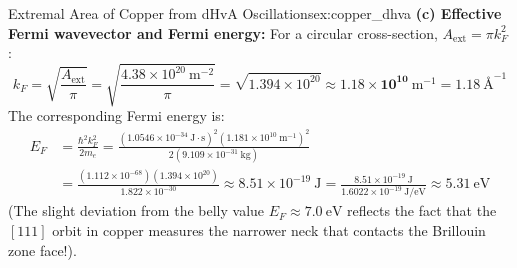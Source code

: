 \documentclass[11pt,a4paper]{article}
\begin{document}
\begin{examplebox}{Extremal Area of Copper from dHvA Oscillations}{ex:copper_dhva}
\textbf{(c) Effective Fermi wavevector and Fermi energy:}
For a circular cross-section, $A_{\mathrm{ext}} = \pi k_F^2$:
\[
k_F = \sqrt{\frac{A_{\mathrm{ext}}}{\pi}} = \sqrt{\frac{4.38 \times 10^{20}\ \mathrm{m^{-2}}}{\pi}} = \sqrt{1.394 \times 10^{20}} \approx \mathbf{1.18 \times 10^{10}\ \mathrm{m^{-1}}} = 1.18\ \text{\AA}^{-1}
\]
The corresponding Fermi energy is:
\begin{align*}
E_F &= \frac{\hbar^2 k_F^2}{2m_e} = \frac{(1.0546 \times 10^{-34}\ \mathrm{J\cdot s})^2 (1.181 \times 10^{10}\ \mathrm{m^{-1}})^2}{2(9.109 \times 10^{-31}\ \mathrm{kg})} \\
&= \frac{(1.112 \times 10^{-68})(1.394 \times 10^{20})}{1.822 \times 10^{-30}} \approx 8.51 \times 10^{-19}\ \mathrm{J} = \frac{8.51 \times 10^{-19}\ \mathrm{J}}{1.6022 \times 10^{-19}\ \mathrm{J/eV}} \approx \mathbf{5.31\ \mathrm{eV}}
\end{align*}
(The slight deviation from the belly value $E_F \approx 7.0\ \mathrm{eV}$ reflects the fact that the $[111]$ orbit in copper measures the narrower neck that contacts the Brillouin zone face!).
\end{examplebox}

\vspace{0.4cm}
\end{document}
